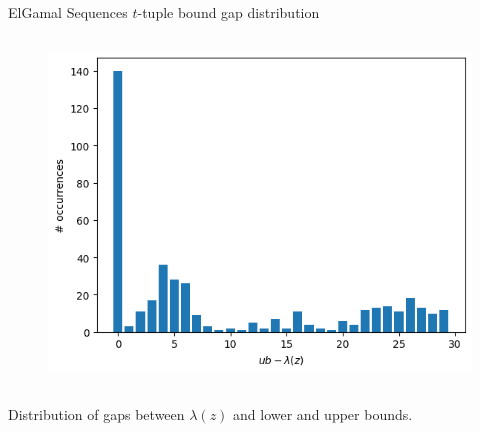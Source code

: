 \begin{frame}{ElGamal Sequences $t$-tuple bound gap distribution}
\begin{columns}
\begin{column}{0.45\textwidth}
\begin{figure}
                \centering
                \includegraphics[width=\textwidth]{figures/UBt7with9356outliers.png}
            \end{figure}
        \end{column}
    \end{columns}
    \begin{center}
                Distribution of gaps between $\lambda(z)$ and lower and upper bounds.
    \end{center}
\end{frame}

